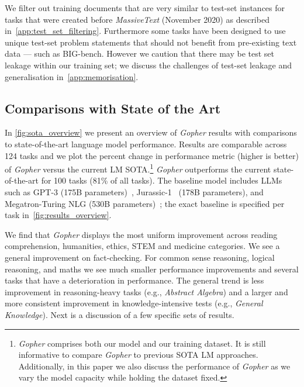 We filter out training documents that are very similar to test-set instances for tasks that were created before \textit{MassiveText} (November 2020) as described in~\autoref{app:test_set_filtering}. Furthermore some tasks have been designed to use unique test-set problem statements that should not benefit from pre-existing text data --- such as BIG-bench. However we caution that there may be test set leakage within our training set; we discuss the challenges of test-set leakage and generalisation in~\autoref{app:memorisation}.

\subsection{Comparisons with State of the Art}

In \autoref{fig:sota_overview} we present an overview of \textit{Gopher} results with comparisons to state-of-the-art language model performance. Results are comparable across 124 tasks and we plot the percent change in performance metric (higher is better) of \textit{Gopher} versus the current LM SOTA.\footnote{\textit{Gopher} comprises both our model and our training dataset. It is still informative to compare \textit{Gopher} to previous SOTA LM approaches. Additionally, in this paper we also discuss the performance of \textit{Gopher} as we vary the model capacity while holding the dataset fixed.}
\textit{Gopher} outperforms the current state-of-the-art for 100 tasks (81\% of all tasks). The baseline model includes LLMs such as GPT-3 (175B parameters)~\citep{gpt3}, Jurassic-1~\citep{jurassic} (178B parameters), and Megatron-Turing NLG (530B parameters)~\citep{Megatron-Turing}; the exact baseline is specified per task in~\autoref{fig:results_overview}. 

We find that \textit{Gopher} displays the most uniform improvement across reading comprehension, humanities, ethics, STEM and medicine categories. We see a general improvement on fact-checking. For common sense reasoning, logical reasoning, and maths we see much smaller performance improvements and several tasks that have a deterioration in performance. The general trend is less improvement in reasoning-heavy tasks (e.g., \textit{Abstract Algebra}) and a larger and more consistent improvement in knowledge-intensive tests (e.g., \textit{General Knowledge}). Next is a discussion of a few specific sets of results.

